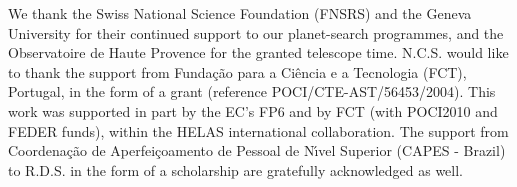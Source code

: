\documentclass{aa}
\begin{document}
\begin{acknowledgements}
  We thank the Swiss National Science Foundation (FNSRS) and the
  Geneva University for their continued support to our planet-search
  programmes, and the Observatoire de Haute Provence for the
  granted telescope time. N.C.S. would like to thank the support from
  Funda\c{c}\~ao para a Ci\^encia e a Tecnologia (FCT), Portugal, in the
  form of a grant (reference POCI/CTE-AST/56453/2004). This work was
  supported in part by the EC's FP6 and by FCT (with POCI2010 and FEDER
  funds), within the HELAS international collaboration. The support from
  Coordena\c c\~ao de Aperfei\c coamento de Pessoal de N\'\i vel Superior
  (CAPES - Brazil) to R.D.S. in the form of a scholarship are gratefully
  acknowledged as well.
\end{acknowledgements}

\end{document}
